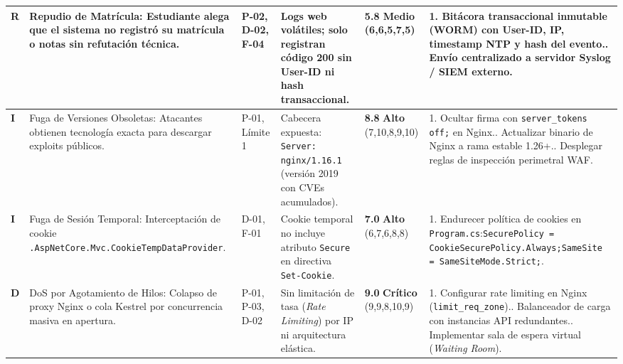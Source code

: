 \begin{longtable}{>{\bfseries\centering\arraybackslash}p{0.6cm} p{2.5cm} p{1.4cm} p{2.6cm} >{\centering\arraybackslash}p{1.4cm} p{5.0cm}}
\midrule
R & Repudio de Matrícula: Estudiante alega que el sistema no registró su matrícula o notas sin refutación técnica. & P-02, D-02, F-04 & Logs web volátiles; solo registran código 200 sin User-ID ni hash transaccional. & \textbf{5.8} \newline \textcolor{blue!80!black}{\textbf{Medio}} \newline \tiny(6,6,5,7,5) & 1. Bitácora transaccional inmutable (WORM) con User-ID, IP, timestamp NTP y hash del evento.\newline 2. Envío centralizado a servidor Syslog / SIEM externo. \\
\midrule
I & Fuga de Versiones Obsoletas: Atacantes obtienen tecnología exacta para descargar exploits públicos. & P-01, Límite 1 & Cabecera expuesta: \texttt{Server: nginx/1.16.1} (versión 2019 con CVEs acumulados). & \textbf{8.8} \newline \textcolor{orange!90!black}{\textbf{Alto}} \newline \tiny(7,10,8,9,10) & 1. Ocultar firma con \texttt{server\_tokens off;} en Nginx.\newline 2. Actualizar binario de Nginx a rama estable 1.26+.\newline 3. Desplegar reglas de inspección perimetral WAF. \\
\midrule
I & Fuga de Sesión Temporal: Interceptación de cookie \texttt{.AspNetCore.\allowbreak Mvc.\allowbreak CookieTemp\allowbreak DataProvider}. & D-01, F-01 & Cookie temporal no incluye atributo \texttt{Secure} en directiva \texttt{Set-Cookie}. & \textbf{7.0} \newline \textcolor{orange!90!black}{\textbf{Alto}} \newline \tiny(6,7,6,8,8) & 1. Endurecer política de cookies en \texttt{Program.cs}:\newline \texttt{SecurePolicy = CookieSecurePolicy.Always;}\newline \texttt{SameSite = SameSiteMode.Strict;}. \\
\midrule
D & DoS por Agotamiento de Hilos: Colapso de proxy Nginx o cola Kestrel por concurrencia masiva en apertura. & P-01, P-03, D-02 & Sin limitación de tasa (\textit{Rate Limiting}) por IP ni arquitectura elástica. & \textbf{9.0} \newline \textcolor{red!80!black}{\textbf{Crítico}} \newline \tiny(9,9,8,10,9) & 1. Configurar rate limiting en Nginx (\texttt{limit\_req\_zone}).\newline 2. Balanceador de carga con instancias API redundantes.\newline 3. Implementar sala de espera virtual (\textit{Waiting Room}). \\

\end{longtable}
